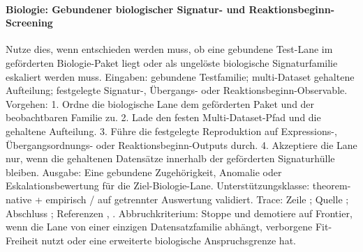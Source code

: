 \paragraph{Biologie: Gebundener biologischer Signatur- und Reaktionsbeginn-Screening}
Nutze dies, wenn entschieden werden muss, ob eine gebundene Test-Lane im geförderten Biologie-Paket liegt oder als ungelöste biologische Signaturfamilie eskaliert werden muss.
Eingaben: gebundene Testfamilie; \allowbreak multi-Dataset gehaltene Aufteilung; \allowbreak festgelegte Signatur-, Übergangs- oder Reaktionsbeginn-Observable.
Vorgehen: 1. Ordne die biologische Lane dem geförderten Paket und der beobachtbaren Familie zu. 2. Lade den festen Multi-Dataset-Pfad und die gehaltene Aufteilung. 3. Führe die festgelegte Reproduktion auf Expressions-, Übergangsordnungs- oder Reaktionsbeginn-Outputs durch. 4. Akzeptiere die Lane nur, wenn die gehaltenen Datensätze innerhalb der geförderten Signaturhülle bleiben.
Ausgabe: Eine gebundene Zugehörigkeit, Anomalie oder Eskalationsbewertung für die Ziel-Biologie-Lane.
Unterstützungsklasse: theorem-native + empirisch / auf getrennter Auswertung validiert.
Trace: Zeile ; \allowbreak Quelle ; \allowbreak Abschluss ; \allowbreak Referenzen , \allowbreak {}.
Abbruchkriterium: Stoppe und demotiere auf Frontier, wenn die Lane von einer einzigen Datensatzfamilie abhängt, verborgene Fit-Freiheit nutzt oder eine erweiterte biologische Anspruchsgrenze hat.

